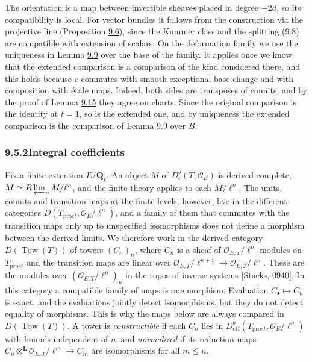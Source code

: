 \documentclass[11pt]{article}
\providecommand{\Dbc}{}\renewcommand{\Dbc}{D^b_c}
\begin{document}
The orientation is a map between invertible sheaves placed in degree \(-2d\), so its compatibility is local. For vector bundles it follows from the construction via the projective line (Proposition \hyperref[bp19]{9.6}), since the Kummer class and the splitting (9.8) are compatible with extension of scalars. On the deformation family we use the uniqueness in Lemma \hyperref[bp27]{9.9} over the base of the family. It applies once we know that the extended comparison is a comparison of the kind considered there, and this holds because \(c\) commutes with smooth exceptional base change and with composition with étale maps. Indeed, both sides are transposes of counits, and by the proof of Lemma \hyperref[bp47]{9.15} they agree on charts. Since the original comparison is the identity at \(t=1\), so is the extended one, and by uniqueness the extended comparison is the comparison of Lemma \hyperref[bp27]{9.9} over \(B\).


\subsubsection*{\texorpdfstring{9.5.2\quad Integral coefficients}{9.5.2 Integral coefficients}}
\label{bp50}%
\label{bp51}%
Fix a finite extension \(E/\mathbf Q_\ell\). An object \(M\) of \(\Dbc(T,\mathcal O_E)\) is derived complete, \(M\simeq R\varprojlim_nM/\ell^n\), and the finite theory applies to each \(M/\ell^n\). The units, counits and transition maps at the finite levels, however, live in the different categories \(D(T_{\mathrm{pro}\acute{e}t},\mathcal O_E/\ell^n)\), and a family of them that commutes with the transition maps only up to unspecified isomorphisms does not define a morphism between the derived limits. We therefore work in the derived category \(D(\operatorname{Tow}(T))\) of towers \((C_n)_n\), where \(C_n\) is a sheaf of \(\mathcal O_{E,T}/\ell^n\)-modules on \(T_{\mathrm{pro}\acute{e}t}\) and the transition maps are linear over \(\mathcal O_{E,T}/\ell^{n+1}\to\mathcal O_{E,T}/\ell^n\). These are the modules over \((\mathcal O_{E,T}/\ell^n)_n\) in the topos of inverse systems [Stacks, \href{https://stacks.math.columbia.edu/tag/0940}{0940}]. In this category a compatible family of maps is one morphism. Evaluation \(C_\bullet\mapsto C_n\) is exact, and the evaluations jointly detect isomorphisms, but they do not detect equality of morphisms. This is why the maps below are always compared in \(D(\operatorname{Tow}(T))\). A tower is \emph{constructible} if each \(C_n\) lies in \(D^b_{\mathrm{ctf}}(T_{\mathrm{pro}\acute{e}t},\mathcal O_E/\ell^n)\) with bounds independent of \(n\), and \emph{normalized} if its reduction maps \(C_n\otimes^{\mathbf L}\mathcal O_{E,T}/\ell^m\to C_m\) are isomorphisms for all \(m\le n\).
\end{document}
